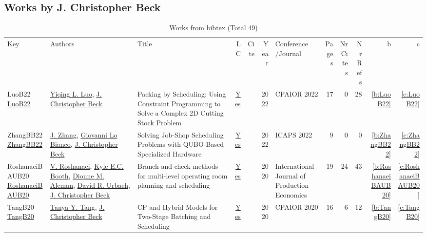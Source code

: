\subsection{Works by J. Christopher Beck}
\label{sec:a89}
{\scriptsize
\begin{longtable}{>{\raggedright\arraybackslash}p{3cm}>{\raggedright\arraybackslash}p{6cm}>{\raggedright\arraybackslash}p{6.5cm}rrrp{2.5cm}rrrrr}
\rowcolor{white}\caption{Works from bibtex (Total 49)}\\ \toprule
\rowcolor{white}Key & Authors & Title & LC & Cite & Year & \shortstack{Conference\\/Journal} & Pages & \shortstack{Nr\\Cites} & \shortstack{Nr\\Refs} & b & c \\ \midrule\endhead
\bottomrule
\endfoot
LuoB22 \href{https://doi.org/10.1007/978-3-031-08011-1\_17}{LuoB22} & \hyperref[auth:a755]{Yiqing L. Luo}, \hyperref[auth:a89]{J. Christopher Beck} & Packing by Scheduling: Using Constraint Programming to Solve a Complex 2D Cutting Stock Problem & \href{works/LuoB22.pdf}{Yes} & \cite{LuoB22} & 2022 & CPAIOR 2022 & 17 & 0 & 28 & \ref{b:LuoB22} & \ref{c:LuoB22}\\
ZhangBB22 \href{https://ojs.aaai.org/index.php/ICAPS/article/view/19826}{ZhangBB22} & \hyperref[auth:a809]{J. Zhang}, \hyperref[auth:a810]{Giovanni Lo Bianco}, \hyperref[auth:a89]{J. Christopher Beck} & Solving Job-Shop Scheduling Problems with QUBO-Based Specialized Hardware & \href{works/ZhangBB22.pdf}{Yes} & \cite{ZhangBB22} & 2022 & ICAPS 2022 & 9 & 0 & 0 & \ref{b:ZhangBB22} & \ref{c:ZhangBB22}\\
RoshanaeiBAUB20 \href{http://dx.doi.org/10.1016/j.ijpe.2019.07.006}{RoshanaeiBAUB20} & \hyperref[auth:a737]{V. Roshanaei}, \hyperref[auth:a1004]{Kyle E.C. Booth}, \hyperref[auth:a913]{Dionne M. Aleman}, \hyperref[auth:a914]{David R. Urbach}, \hyperref[auth:a89]{J. Christopher Beck} & Branch-and-check methods for multi-level operating room planning and scheduling & \href{works/RoshanaeiBAUB20.pdf}{Yes} & \cite{RoshanaeiBAUB20} & 2020 & International Journal of Production Economics & 19 & 24 & 43 & \ref{b:RoshanaeiBAUB20} & \ref{c:RoshanaeiBAUB20}\\
TangB20 \href{https://doi.org/10.1007/978-3-030-58942-4\_28}{TangB20} & \hyperref[auth:a88]{Tanya Y. Tang}, \hyperref[auth:a89]{J. Christopher Beck} & {CP} and Hybrid Models for Two-Stage Batching and Scheduling & \href{works/TangB20.pdf}{Yes} & \cite{TangB20} & 2020 & CPAIOR 2020 & 16 & 6 & 12 & \ref{b:TangB20} & \ref{c:TangB20}\\

\end{longtable}}
